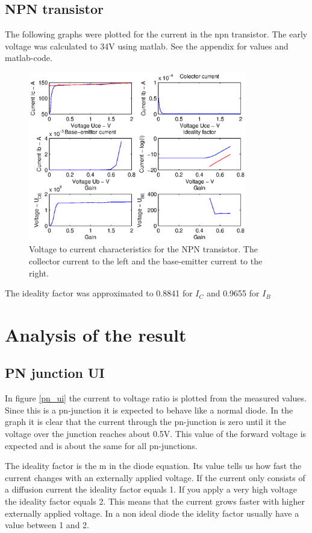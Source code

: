 \documentclass[a4paper]{article}
\begin{document}
\subsection{NPN transistor}
The following graphs were plotted for the current in the npn transistor. The early voltage was calculated to 34V using matlab. See the appendix for values and matlab-code.
\begin{figure}[H]
	\centering
	\includegraphics[width=0.85\textwidth]{npn_n.eps}
	\caption{Voltage to current characteristics for the NPN transistor. The collector current to the left and the base-emitter current to the right.}
	\label{npn}
\end{figure}

The ideality factor was approximated to 0.8841 for $I_C$ and 0.9655 for $I_B$ 

\newpage
\section{Analysis of the result}
\subsection{PN junction UI}
In figure \ref{pn_ui} the current to voltage ratio is plotted from the measured values. Since this is a pn-junction it is expected to behave like a normal diode. In the graph it is clear that the current through the pn-junction is zero until it the voltage over the junction reaches about 0.5V. This value of the forward voltage is expected and is about the same for all pn-junctions. 

The ideality factor is the m in the diode equation. Its value tells us how fast the current changes with an externally applied voltage. If the current only consists of a diffusion current the ideality factor equals 1. If you apply a very high voltage the ideality factor equals 2. This means that the current grows faster with higher externally applied voltage. In a non ideal diode the idelity factor usually have a value between 1 and 2.
\end{document}
